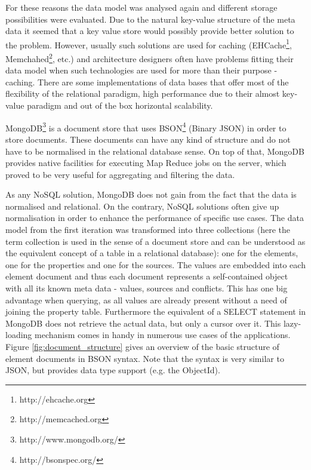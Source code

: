 For these reasons the data model was analysed again and different storage possibilities were evaluated.  Due to the natural key-value structure of the meta data it seemed that a key value store would possibly provide better solution to the problem. However, usually such solutions are used for caching (EHCache\footnote{http://ehcache.org}, Memchahed\footnote{http://memcached.org}, etc.) and architecture designers often have problems fitting their data model when such technologies are used for more than their purpose - caching. There are some implementations of data bases that offer most of the flexibility of the relational paradigm, high performance due to their almost key-value paradigm and out of the box horizontal scalability.

MongoDB\footnote{http://www.mongodb.org/} is a document store that uses BSON\footnote{http://bsonspec.org/} (Binary JSON) in order to store documents. These documents can have any kind of structure and do not have to be normalised in the relational database sense. On top of that, MongoDB provides native facilities for executing Map Reduce \cite{Dean:2008:MSD:1327452.1327492} jobs on the server, which proved to be very useful for aggregating and filtering the data. 

As any NoSQL solution, MongoDB does not gain from the fact that the data is normalised and relational. On the contrary, NoSQL solutions often give up normalisation in order to enhance the performance of specific use cases. The data model from the first iteration was transformed into three collections (here the term collection is used in the sense of a document store and can be understood as the equivalent concept of a table in a relational database): one for the elements, one for the properties and one for the sources. The values are embedded into each element document and thus each document represents a self-contained object with all its known meta data - values, sources and conflicts. This has one big advantage when querying, as all values are already present without a need of joining the property table. Furthermore the equivalent of a SELECT statement in MongoDB does not retrieve the actual data, but only a cursor over it. This lazy-loading mechanism comes in handy in numerous use cases of the applications.
Figure \ref{fig:document_structure} gives an overview of the basic structure of element documents in BSON syntax. Note that the syntax is very similar to JSON, but provides data type support (e.g. the ObjectId).

